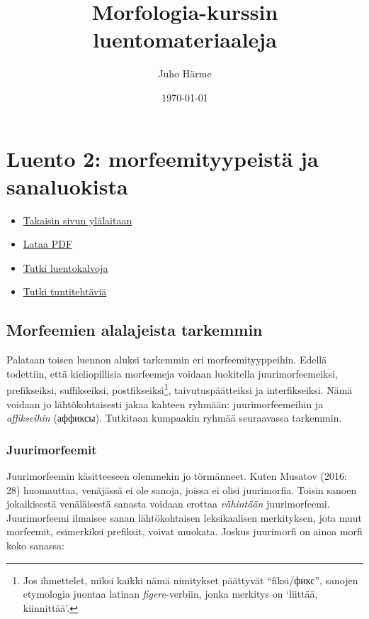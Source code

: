 \documentclass[]{scrartcl}
\author{Juho Härme}
\title{Morfologia-kurssin luentomateriaaleja}
\date{\today}
\begin{document}
\maketitle
\tableofcontents
\newpage



\section{Luento 2: morfeemityypeistä ja
sanaluokista}\label{luento-2-morfeemityypeistuxe4-ja-sanaluokista}

\begin{itemize}
\itemsep1pt\parskip0pt
\item
  \href{https://mustikka.uta.fi/~juho_harme/morfologia/\#tästä-kurssista}{Takaisin
  sivun ylälaitaan}
\item
  \href{http://mustikka.uta.fi/~juho_harme/morfologia/materiaalit/luento2.pdf}{Lataa
  PDF}
\item
  \href{http://mustikka.uta.fi/~juho_harme/morfologia/presentations/luento2.html}{Tutki
  luentokalvoja}
\item
  \href{http://mustikka.uta.fi/~juho_harme/morfologia/tehtavat/luento2.pdf}{Tutki
  tuntitehtäviä}
\end{itemize}

\subsection{Morfeemien alalajeista
tarkemmin}\label{morfeemien-alalajeista-tarkemmin}

Palataan toisen luennon aluksi tarkemmin eri morfeemityyppeihin. Edellä
todettiin, että kieliopillisia morfeemeja voidaan luokitella
juurimorfeemeiksi, prefikseiksi, suffikseiksi, postfikseiksi\footnote{Jos
  ihmettelet, miksi kaikki nämä nimitykset päättyvät ``fiksi/фикс'',
  sanojen etymologia juontaa latinan \emph{figere}-verbiin, jonka
  merkitys on `liittää, kiinnittää'.}, taivutuspäätteiksi ja
interfikseiksi. Nämä voidaan jo lähtökohtaisesti jakaa kahteen ryhmään:
juurimorfeemeihin ja \emph{affikseihin} (аффиксы). Tutkitaan kumpaakin
ryhmää seuraavassa tarkemmin.

\subsubsection{Juurimorfeemit}\label{juurimorfeemit}

Juurimorfeemin käsitteeseen olemmekin jo törmänneet. Kuten Musatov
(2016: 28) huomauttaa, venäjässä ei ole sanoja, joissa ei olisi
juurimorfia. Toisin sanoen jokaikisestä venäläisestä sanasta voidaan
erottaa \emph{vähintään} juurimorfeemi. Juurimorfeemi ilmaisee sanan
lähtökohtaisen leksikaalisen merkityksen, jota muut morfeemit,
esimerkiksi prefiksit, voivat muokata. Joskus juurimorfi on ainoa morfi
koko sanassa:
\end{document}
